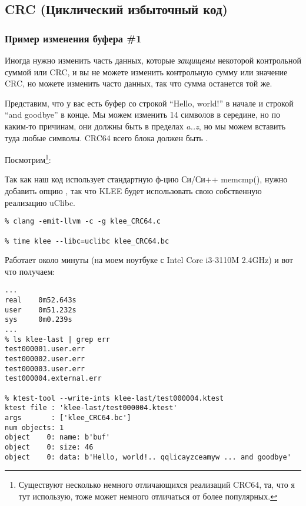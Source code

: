 \subsection{CRC (Циклический избыточный код)}

\subsubsection{Пример изменения буфера \#1}

Иногда нужно изменить часть данных, которые \textit{защищены} некоторой контрольной суммой или
\ac{CRC}, и вы не можете изменить контрольную сумму или значение CRC, но можете изменить часто данных, так что
сумма останется той же.

Представим, что у вас есть буфер со строкой ``Hello, world!'' в начале и строкой ``and goodbye'' в конце.
Мы можем изменить 14 символов в середине, но по каким-то причинам, они должны быть в пределах \textit{a..z}, но мы можем
вставить туда любые символы.
CRC64 всего блока должен быть .

Посмотрим\footnote{Существуют несколько немного отличающихся реализаций CRC64, та, что я тут использую, тоже может немного
отличаться от более популярных.}:



Так как наш код использует стандартную ф-цию Си/Си++ memcmp(), нужно добавить опцию , так что
KLEE будет использовать свою собственную реализацию uClibc.

\begin{lstlisting}
% clang -emit-llvm -c -g klee_CRC64.c

% time klee --libc=uclibc klee_CRC64.bc
\end{lstlisting}

Работает около минуты (на моем ноутбуке с Intel Core i3-3110M 2.4GHz) и вот что получаем:

\begin{lstlisting}
...
real    0m52.643s
user    0m51.232s
sys     0m0.239s
...
% ls klee-last | grep err
test000001.user.err
test000002.user.err
test000003.user.err
test000004.external.err

% ktest-tool --write-ints klee-last/test000004.ktest
ktest file : 'klee-last/test000004.ktest'
args       : ['klee_CRC64.bc']
num objects: 1
object    0: name: b'buf'
object    0: size: 46
object    0: data: b'Hello, world!.. qqlicayzceamyw ... and goodbye'
\end{lstlisting}

